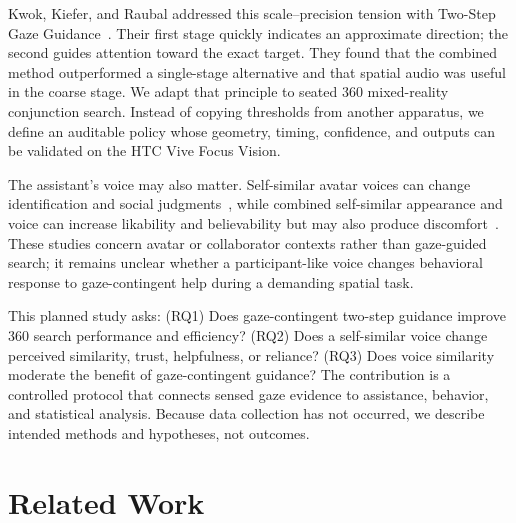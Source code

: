 \documentclass[10pt,journal,compsoc]{IEEEtran}
\begin{document}
Kwok, Kiefer, and Raubal addressed this scale--precision tension with Two-Step Gaze Guidance~\cite{kwok2022twostep}. Their first stage quickly indicates an approximate direction; the second guides attention toward the exact target. They found that the combined method outperformed a single-stage alternative and that spatial audio was useful in the coarse stage. We adapt that principle to seated 360\textdegree{} mixed-reality conjunction search. Instead of copying thresholds from another apparatus, we define an auditable policy whose geometry, timing, confidence, and outputs can be validated on the HTC Vive Focus Vision.

The assistant's voice may also matter. Self-similar avatar voices can change identification and social judgments~\cite{kao2021selfsimilar}, while combined self-similar appearance and voice can increase likability and believability but may also produce discomfort~\cite{guo2024doppelganger}. These studies concern avatar or collaborator contexts rather than gaze-guided search; it remains unclear whether a participant-like voice changes behavioral response to gaze-contingent help during a demanding spatial task.

This planned study asks: (RQ1) Does gaze-contingent two-step guidance improve 360\textdegree{} search performance and efficiency? (RQ2) Does a self-similar voice change perceived similarity, trust, helpfulness, or reliance? (RQ3) Does voice similarity moderate the benefit of gaze-contingent guidance? The contribution is a controlled protocol that connects sensed gaze evidence to assistance, behavior, and statistical analysis. Because data collection has not occurred, we describe intended methods and hypotheses, not outcomes.

\section{Related Work}
\end{document}
